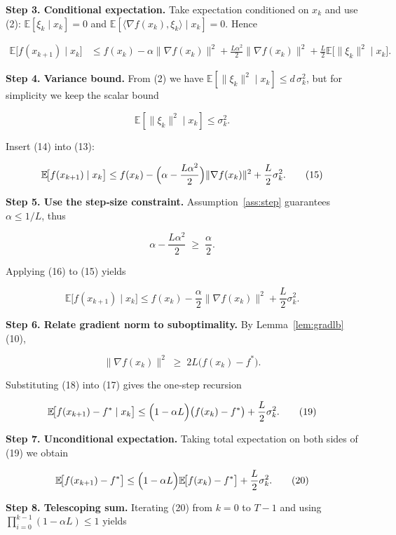 \documentclass[11pt]{article}
\newcommand{\E}{\mathbb{E}}
\begin{document}
\noindent\textbf{Step 3. Conditional expectation.}  
Take expectation conditioned on $x_{k}$ and use (2): $\E[\xi_{k}\mid x_{k}]=0$ and
$\E[\langle\nabla f(x_{k}),\xi_{k}\rangle\mid x_{k}]=0$. Hence  

\[
\begin{aligned}
\E\!\bigl[f(x_{k+1})\mid x_{k}\bigr]
&\le f(x_{k})-\alpha\|\nabla f(x_{k})\|^{2}
+\frac{L\alpha^{2}}{2}\|\nabla f(x_{k})\|^{2}
+\frac{L}{2}\E\!\bigl[\|\xi_{k}\|^{2}\mid x_{k}\bigr].
\end{aligned}
\tag{13}
\]

\noindent\textbf{Step 4. Variance bound.}  
From (2) we have $\E[\|\xi_{k}\|^{2}\mid x_{k}]\le d\,\sigma_{k}^{2}$, but for
simplicity we keep the scalar bound  

\[
\E[\|\xi_{k}\|^{2}\mid x_{k}]\le \sigma_{k}^{2}.
\tag{14}
\]

Insert (14) into (13):

\[
\E\!\bigl[f(x_{k+1})\mid x_{k}\bigr]
\le f(x_{k})-\Bigl(\alpha-\frac{L\alpha^{2}}{2}\Bigr)\|\nabla f(x_{k})\|^{2}
+\frac{L}{2}\sigma_{k}^{2}.
\tag{15}
\]

\noindent\textbf{Step 5. Use the step‑size constraint.}  
Assumption~\ref{ass:step} guarantees $\alpha\le 1/L$, thus  

\[
\alpha-\frac{L\alpha^{2}}{2}\;\ge\;\frac{\alpha}{2}.
\tag{16}
\]

Applying (16) to (15) yields  

\[
\E\!\bigl[f(x_{k+1})\mid x_{k}\bigr]
\le f(x_{k})-\frac{\alpha}{2}\|\nabla f(x_{k})\|^{2}
+\frac{L}{2}\sigma_{k}^{2}.
\tag{17}
\]

\noindent\textbf{Step 6. Relate gradient norm to suboptimality.}  
By Lemma~\ref{lem:gradlb} (10),

\[
\|\nabla f(x_{k})\|^{2}\;\ge\;2L\bigl(f(x_{k})-f^{*}\bigr).
\tag{18}
\]

Substituting (18) into (17) gives the one‑step recursion  

\[
\E\!\bigl[f(x_{k+1})-f^{*}\mid x_{k}\bigr]
\le\Bigl(1-\alpha L\Bigr)\bigl(f(x_{k})-f^{*}\bigr)
+\frac{L}{2}\sigma_{k}^{2}.
\tag{19}
\]

\noindent\textbf{Step 7. Unconditional expectation.}  
Taking total expectation on both sides of (19) we obtain  

\[
\E\!\bigl[f(x_{k+1})-f^{*}\bigr]
\le\Bigl(1-\alpha L\Bigr)\E\!\bigl[f(x_{k})-f^{*}\bigr]
+\frac{L}{2}\sigma_{k}^{2}.
\tag{20}
\]

\noindent\textbf{Step 8. Telescoping sum.}  
Iterating (20) from $k=0$ to $T-1$ and using $\prod_{i=0}^{k-1}(1-\alpha L)\le
1$ yields  
\end{document}
